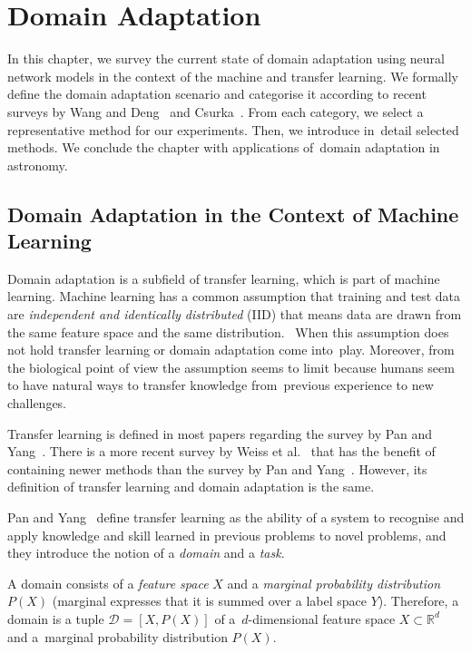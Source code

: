 \chapter{Domain Adaptation}
\label{da_chapter}

In this chapter, we survey the current state of domain adaptation using neural network models
in the context of the machine and transfer learning.
We formally define the domain adaptation scenario
and categorise it according to recent surveys
by Wang and Deng~\cite{wang2018} and Csurka~\cite{csurka2017}.
From each category, we select a representative method for our experiments.
Then, we introduce in~detail selected methods.
We conclude the chapter with applications of~domain adaptation in astronomy.

\section{Domain Adaptation in the Context of Machine Learning}

Domain adaptation is a subfield of transfer learning,
which is part of machine learning.
Machine learning has a common assumption that training and test data are
\textit{independent and identically distributed} (IID)
that means data are drawn from the same feature space and the same distribution.~\cite{daume2006}
When this assumption does not hold transfer learning or domain adaptation come into~play.
Moreover, from the biological point of view the assumption seems to limit
because humans seem to have natural ways to transfer knowledge from~previous experience to new challenges.~\cite{torrey2010}

Transfer learning is defined in most papers regarding the survey by Pan and Yang~\cite{pan2010}.
There is a more recent survey by Weiss et al.~\cite{weiss2016}
that has the benefit of containing newer methods than the survey by Pan and Yang~\cite{pan2010}.
However, its definition of transfer learning and domain adaptation is the same.

Pan and Yang~\cite{pan2010} define transfer learning
as the ability of a system to recognise and apply knowledge and skill
learned in previous problems to novel problems,
and they introduce the notion of a \textit{domain} and a \textit{task}.

A domain consists of a \textit{feature space} \(X\) and a \textit{marginal probability distribution} \(P(X)\)
(marginal expresses that it is summed over a label space \(Y\)).
Therefore, a domain is a tuple \(\mathcal{D} = [X, P(X)]\)
of a~\(d\)-dimensional feature space \(X \subset \mathbb{R}^d\)
and a~marginal probability distribution \(P(X)\).

